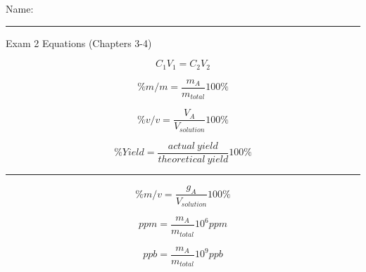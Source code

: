 \documentclass[11pt, letterpaper]{memoir}
\begin{document}
  {\large Name: \rule[-1mm]{4in}{.1pt} }

	\begin{center}
		{\large Exam 2 Equations (Chapters 3-4)}
	\end{center}

  \begin{minipage}[c][\stretch{1}][c]{0.46\linewidth}
    \begin{equation*}
      C_1V_1=C_2V_2
    \end{equation*}
        
    \begin{equation*}
      \%m/m=\dfrac{m_A}{m_{total}}100\%
    \end{equation*}
        
    \begin{equation*}
      \%v/v=\dfrac{V_A}{V_{solution}}100\%
    \end{equation*}

    \begin{equation*}
      \%Yield=\frac{actual~yield}{theoretical~yield}100\%
    \end{equation*}
  \end{minipage}
  \rule[-400pt]{1.5pt}{600pt}
  \begin{minipage}[c][\stretch{1}][c]{0.5\linewidth}
    \begin{equation*}
      \%m/v=\dfrac{g_A}{V_{solution}}100\%
    \end{equation*}
        
    \begin{equation*}
      ppm=\dfrac{m_A}{m_{total}}10^6ppm
    \end{equation*}
        
    \begin{equation*}
      ppb=\dfrac{m_A}{m_{total}}10^9ppb
    \end{equation*}
  \end{minipage}
\end{document}
